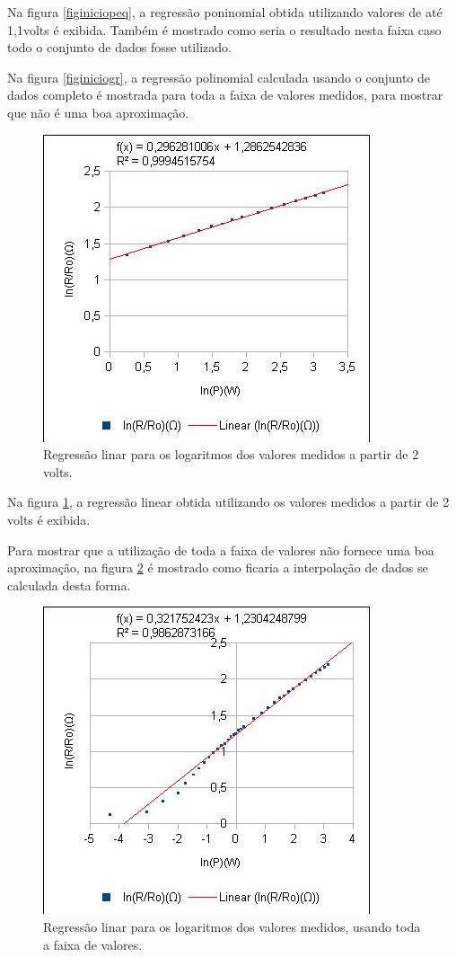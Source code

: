 \documentclass[brazilian,12pt,a4paper,final]{article}
\begin{document}
Na figura \ref{figiniciopeq}, a regressão poninomial obtida utilizando 
valores de até 1,1volts é exibida.
Também é 
mostrado como seria o resultado nesta faixa caso todo o conjunto de dados fosse utilizado.

Na figura \ref{figiniciogr}, a regressão polinomial calculada usando o
 conjunto de dados completo é mostrada para toda a faixa de valores medidos, para
mostrar que não é uma boa aproximação.

\begin{figure}[htbp!]
  \caption{Regressão linar para os logaritmos dos valores medidos a partir de 2 volts.}
  \label{figfimpeq}
  \centering
    \includegraphics{fimpeq.jpg}
\end{figure}

Na figura \ref{figfimpeq}, a regressão linear obtida utilizando 
os valores medidos a partir de 2 volts é exibida.


Para mostrar que a utilização de toda a faixa de valores não fornece uma boa aproximação,
na figura \ref{figfimgr} é mostrado como ficaria a interpolação de dados se calculada desta forma.

\begin{figure}[htbp!]
  \caption{Regressão linar para os logaritmos dos valores medidos, usando toda a faixa de valores.}
  \label{figfimgr}
  \centering
    \includegraphics{fimgr.jpg}
\end{figure}
\end{document}
